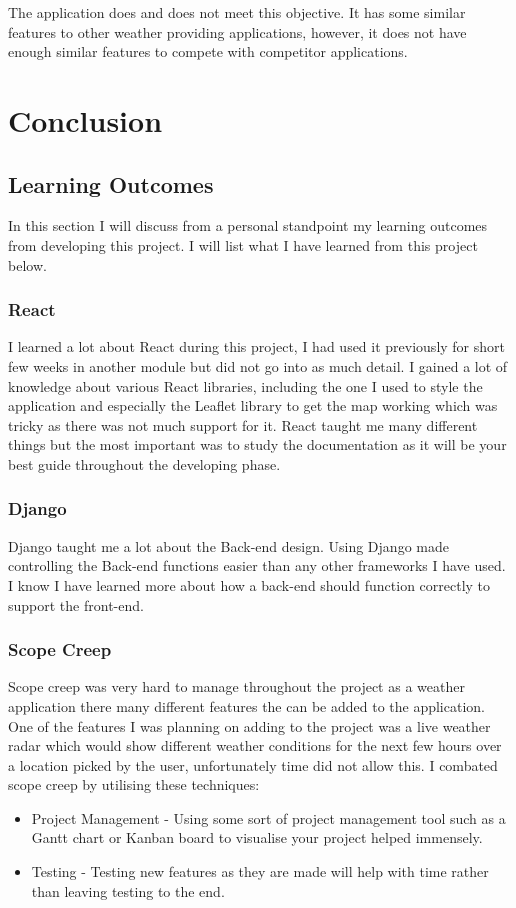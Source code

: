 The application does and does not meet this objective. It has some similar features to other weather providing applications, however, it does not have enough similar features to compete with competitor applications. 

\chapter{Conclusion}
\section{Learning Outcomes}
In this section I will discuss from a personal standpoint my learning outcomes from developing this project. I will list what I have learned from this project below.

\subsection{React}
I learned a lot about React during this project, I had used it previously for short few weeks in another module but did not go into as much detail. I gained a lot of knowledge about various React libraries, including the one I used to style the application and especially the Leaflet library to get the map working which was tricky as there was not much support for it. React taught me many different things but the most important was to study the documentation as it will be your best guide throughout the developing phase.

\subsection{Django}
Django taught me a lot about the Back-end design. Using Django made controlling the Back-end functions easier than any other frameworks I have used. I know I have learned more about how a back-end should function correctly to support the front-end.

\subsection{Scope Creep}
Scope creep was very hard to manage throughout the project as a weather application there many different features the can be added to the application. One of the features I was planning on adding to the project was a live weather radar which would show different weather conditions for the next few hours over a location picked by the user, unfortunately time did not allow this. I combated scope creep by utilising these techniques:
\begin{itemize}
    \item Project Management - Using some sort of project management tool such as a Gantt chart or Kanban board to visualise your project helped immensely.
    
    \item Testing - Testing new features as they are made will help with time rather than leaving testing to the end. 
    
\end{itemize}

